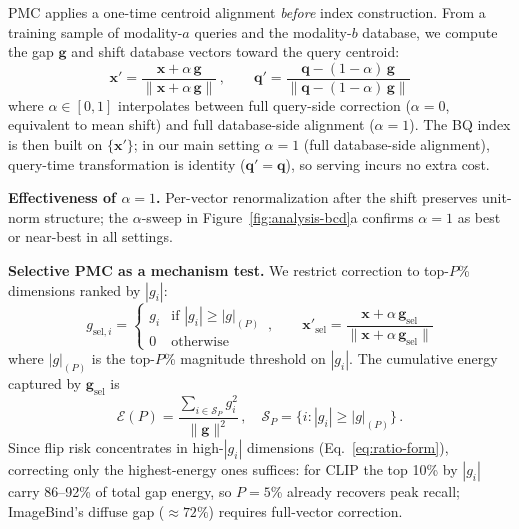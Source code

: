 PMC applies a one-time centroid alignment \emph{before} index
construction.
From a training sample of modality-$a$ queries and the modality-$b$
database, we compute the gap $\mathbf{g}$ and shift database vectors
toward the query centroid:
%
\begin{equation}\label{eq:pmc}
  \mathbf{x}' = \frac{\mathbf{x} + \alpha \, \mathbf{g}}
                      {\|\mathbf{x} + \alpha \, \mathbf{g}\|}
  \,,\qquad
  \mathbf{q}' = \frac{\mathbf{q} - (1-\alpha) \, \mathbf{g}}
                      {\|\mathbf{q} - (1-\alpha) \, \mathbf{g}\|}
\end{equation}
%
where $\alpha \in [0,1]$ interpolates between full query-side correction
($\alpha{=}0$, equivalent to mean shift) and full database-side alignment
($\alpha{=}1$).
The BQ index is then built on $\{\mathbf{x}'\}$; in our main setting
$\alpha{=}1$ (full database-side alignment), query-time transformation is
identity ($\mathbf{q}'{=}\mathbf{q}$), so serving incurs no extra cost.

\textbf{Effectiveness of {\boldmath$\alpha{=}1$}.}
Per-vector renormalization after the shift preserves unit-norm structure; the $\alpha$-sweep in Figure~\ref{fig:analysis-bcd}a confirms $\alpha{=}1$ as best or near-best in all settings.

\textbf{Selective PMC as a mechanism test.}
We restrict correction to top-$P$\% dimensions ranked by $|g_i|$:
\begin{equation}\label{eq:selective}
  g_{\mathrm{sel},i} = \begin{cases}
    g_i & \text{if } |g_i| \ge |g|_{(P)} \\
    0   & \text{otherwise}
  \end{cases}
  \,,\qquad
  \mathbf{x}'_{\mathrm{sel}} = \frac{\mathbf{x} + \alpha \, \mathbf{g}_{\mathrm{sel}}}{\|\mathbf{x} + \alpha \, \mathbf{g}_{\mathrm{sel}}\|}
\end{equation}
where $|g|_{(P)}$ is the top-$P$\% magnitude threshold on $|g_i|$. The cumulative energy captured by $\mathbf{g}_{\mathrm{sel}}$ is
\begin{equation}\label{eq:energy-frac}
  \mathcal{E}(P) = \frac{\sum_{i \in \mathcal{S}_P} g_i^2}{\|\mathbf{g}\|^2}\,,
  \quad \mathcal{S}_P = \bigl\{i : |g_i| \geq |g|_{(P)}\bigr\}\,.
\end{equation}
Since flip risk concentrates in high-$|g_i|$ dimensions (Eq.~\eqref{eq:ratio-form}), correcting only the highest-energy ones suffices: for CLIP the top 10\% by $|g_i|$ carry 86--92\% of total gap energy, so $P{=}5$\% already recovers peak recall; ImageBind's diffuse gap (${\approx}72\%$) requires full-vector correction.

